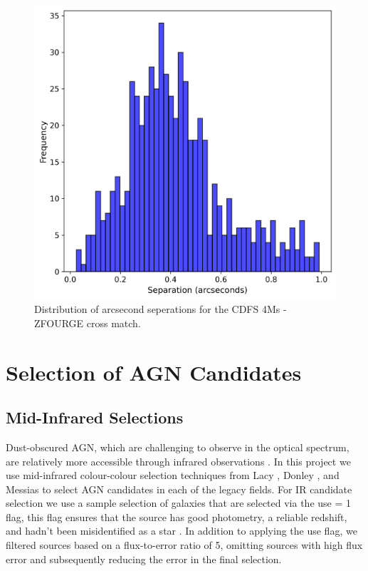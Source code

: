 \documentclass[11pt]{iopart}
\begin{document}
\begin{figure}[h]
  \centering
  \includegraphics[width=1\linewidth]{plots/CDFS_4Ms_Xray_Sep.png}
  \caption{Distribution of arcsecond seperations for the CDFS 4Ms - ZFOURGE cross match.}
  \label{fig:ArcsecondSep}
\end{figure}
\section{Selection of AGN Candidates}
\subsection{Mid-Infrared Selections}
Dust-obscured AGN, which are challenging to observe in the optical spectrum, are relatively more accessible through infrared observations \cite{yutani_origin_2022}. In this project we use mid-infrared colour-colour selection techniques from Lacy \cite{lacy_obscured_2004, lacy_optical_2007}, Donley \cite{donley_identifying_2012, donley_spitzer_2007}, and Messias \cite{messias_new_2012, messias_dependency_2014}  to select AGN candidates in each of the legacy fields. For IR candidate selection we use a sample selection of galaxies that are selected via the use = 1 flag, this flag ensures that the source has good photometry, a reliable redshift, and hadn't been misidentified as a star \cite{straatman_fourstar_2016}. In addition to applying the use flag, we filtered sources based on a flux-to-error ratio of 5, omitting sources with high flux error and subsequently reducing the error in the final selection.
\end{document}
